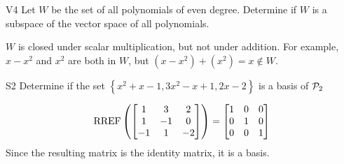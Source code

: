 \documentclass{sbgLAquiz}
\begin{document}
\begin{extract}\newpage\end{extract}
\begin{problem}{V4} Let $W$ be the set of all polynomials of even degree.  Determine if $W$ is a subspace of the vector space of all polynomials.
\end{problem}
\begin{solution}
$W$ is closed under scalar multiplication, but not under addition.  For example, $x-x^2$ and $x^2$ are both in $W$, but $(x-x^2)+(x^2)=x \notin W$.
\end{solution}


\begin{problem}{S2}
Determine if the set $\left\{ x^2+x-1, 3x^2-x+1, 2x-2 \right\}$ is a basis of $\P_2$
\end{problem}
\begin{solution}
$$\RREF\left(\begin{bmatrix} 1 & 3 & 2 \\ 1 & -1 & 0 \\ -1 & 1 & -2 \end{bmatrix} \right)= \begin{bmatrix} 1 & 0 &0 \\ 0 & 1 & 0 \\ 0 & 0 & 1\end{bmatrix}$$
Since the resulting matrix is the identity matrix, it is a basis.
\end{solution}
\end{document}
